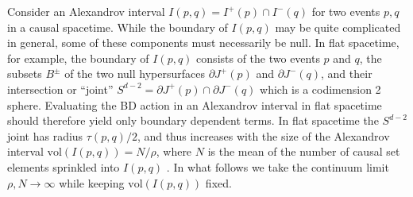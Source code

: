 \documentclass[12pt]{article}
\renewcommand{\ss}[1]{\marginnote{\color{red}{\small SS:\,#1}}}
\begin{document}
{Consider an Alexandrov interval $I(p,q)=I^+(p) \cap I^-(q)$ for two events $p,q$ in a causal spacetime.   While the  boundary of $I(p,q)$ may be quite complicated in general, some of these components must necessarily be null.  In flat spacetime, for example,  the boundary of $I(p,q)$ consists of the two events $p$ and $q$, the subsets $B^\pm$ of the  two null hypersurfaces $\partial J^+(p)$ and $\partial J^-(q)$, and their intersection or ``joint''  $S^{d-2}=\partial J^+(p) \cap \partial J^-(q)$ which is a codimension 2 sphere.  Evaluating the BD action in an Alexandrov interval in flat spacetime should therefore yield  only boundary dependent terms.  In flat spacetime the $S^{d-2}$ joint  has radius $\tau(p,q)/2$, and thus increases with the size of the Alexandrov interval ${\mathrm{vol}}(I(p,q)) = N/\rho$, where $N$ is the mean of the number of causal set elements sprinkled into $I(p,q)$ . In what follows we take the continuum limit $\rho, N \rightarrow \infty$ while keeping ${\mathrm{vol}}(I(p,q))$ fixed. \ss{It would be nice to have a fancy picture of an Alex. interval here..}  

}
\end{document}
